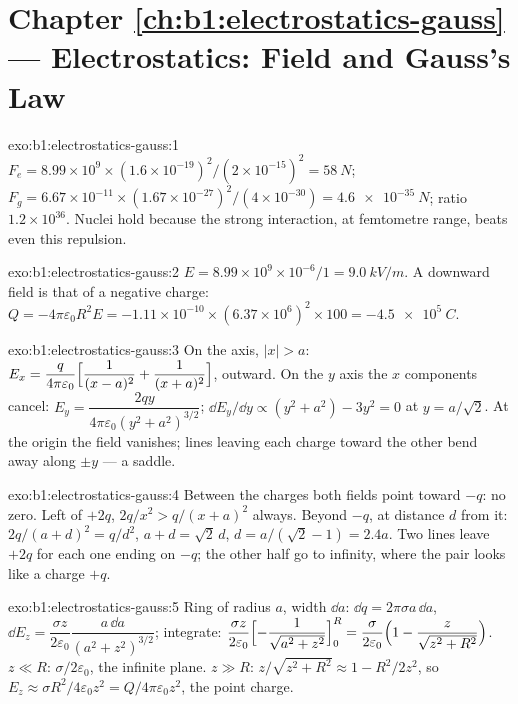 \section*{Chapter \ref{ch:b1:electrostatics-gauss} --- Electrostatics: Field and Gauss's Law}

\begin{solution}{exo:b1:electrostatics-gauss:1}
$F_e = 8.99 \times 10^9 \times (1.6 \times 10^{-19})^2/(2 \times 10^{-15})^2 = \qty{58}{N}$;
$F_g = 6.67 \times 10^{-11} \times (1.67 \times 10^{-27})^2/(4 \times 10^{-30}) =
\qty{4.6e-35}{N}$; ratio $1.2 \times 10^{36}$. Nuclei hold because the strong
interaction, at femtometre range, beats even this repulsion.
\end{solution}

\begin{solution}{exo:b1:electrostatics-gauss:2}
$E = 8.99 \times 10^9 \times 10^{-6}/1 = \qty{9.0}{kV/m}$. A downward field is
that of a negative charge: $Q = -4\pi\varepsilon_0R^2E = -1.11 \times 10^{-10} \times
(6.37 \times 10^6)^2 \times 100 = \qty{-4.5e5}{C}$.
\end{solution}

\begin{solution}{exo:b1:electrostatics-gauss:3}
On the axis, $|x| > a$: $E_x = \dfrac{q}{4\pi\varepsilon_0}\Bigl[\dfrac{1}{(x - a)^2} +
\dfrac{1}{(x + a)^2}\Bigr]$, outward. On the $y$ axis the $x$ components
cancel: $E_y = \dfrac{2qy}{4\pi\varepsilon_0(y^2 + a^2)^{3/2}}$; $\dd E_y/\dd y \propto
(y^2 + a^2) - 3y^2 = 0$ at $y = a/\sqrt2$. At the origin the field
vanishes; lines leaving each charge toward the other bend away along
$\pm y$ --- a saddle.
\end{solution}

\begin{solution}{exo:b1:electrostatics-gauss:4}
Between the charges both fields point toward $-q$: no zero. Left of
$+2q$, $2q/x^2 > q/(x + a)^2$ always. Beyond $-q$, at distance $d$ from
it: $2q/(a + d)^2 = q/d^2$, $a + d = \sqrt2\,d$, $d = a/(\sqrt2 - 1) = 2.4a$.
Two lines leave $+2q$ for each one ending on $-q$; the other half go to
infinity, where the pair looks like a charge $+q$.
\end{solution}

\begin{solution}{exo:b1:electrostatics-gauss:5}
Ring of radius $a$, width $\dd a$: $\dd q = 2\pi\sigma a\,\dd a$, $\dd E_z =
\dfrac{\sigma z}{2\varepsilon_0}\dfrac{a\,\dd a}{(a^2 + z^2)^{3/2}}$; integrate:
$\dfrac{\sigma z}{2\varepsilon_0}\Bigl[-\dfrac{1}{\sqrt{a^2 + z^2}}\Bigr]_0^R = \dfrac{\sigma}{2\varepsilon_0}
\Bigl(1 - \dfrac{z}{\sqrt{z^2 + R^2}}\Bigr)$. $z \ll R$: $\sigma/2\varepsilon_0$, the
infinite plane. $z \gg R$: $z/\sqrt{z^2 + R^2} \approx 1 - R^2/2z^2$, so $E_z
\approx \sigma R^2/4\varepsilon_0z^2 = Q/4\pi\varepsilon_0z^2$, the point charge.
\end{solution}

